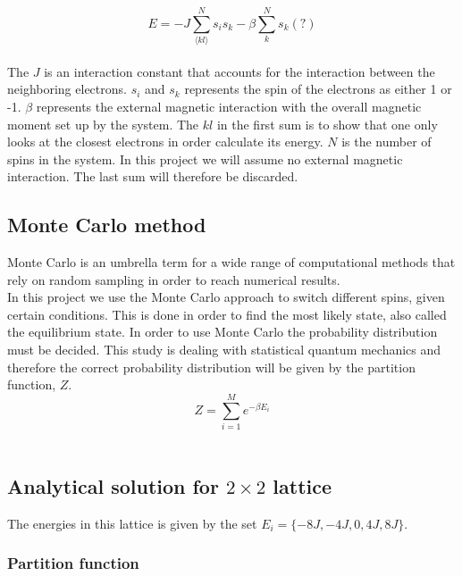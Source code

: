 \documentclass{article}
\begin{document}
\begin{equation} \label{eq:isingmodel}
    E = -J \sum_{ \langle kl \rangle }^{N} s_i s_k - \beta \sum_{k}^{N}s_k (?)
\end{equation} \\

The $J$ is an interaction constant that accounts for the interaction between the neighboring electrons. $s_i$ and $s_k$ represents the spin of the electrons as either 1 or -1. $\beta$ represents the external magnetic interaction with the overall magnetic moment set up by the system. The $kl$ in the first sum is to show that one only looks at the closest electrons in order calculate its energy. $N$ is the number of spins in the system. In this project we will assume no external magnetic interaction. The last sum will therefore be discarded. \cite{isingmodel} \\

\subsection{Monte Carlo method}

Monte Carlo is an umbrella term for a wide range of computational methods that rely on random sampling in order to reach numerical results. \\

In this project we use the Monte Carlo approach to switch different spins, given certain conditions. This is done in order to find the most likely state, also called the equilibrium state. In order to use Monte Carlo the probability distribution must be decided. This study is dealing with statistical quantum mechanics and therefore the correct probability distribution will be given by the partition function, $Z$. \\

$$Z = \sum_{i=1}^{M} e^{-\beta E_i} $$ \\


\subsection{Analytical solution for \texorpdfstring{ $2 \times 2$ }{text} lattice}

The energies in this lattice is given by the set $E_i = \{- 8 J, -4J, 0 , 4J, 8J \}$.


\subsubsection{Partition function} \label{sec:partitionfunction}
\end{document}
